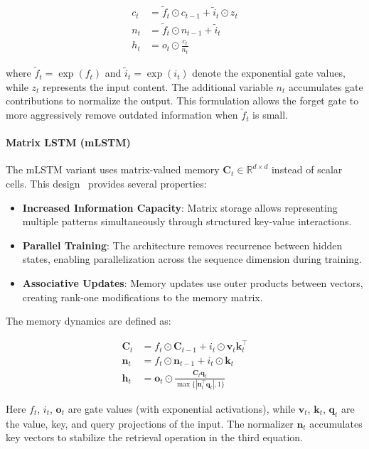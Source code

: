 \begin{align}
c_t &= \tilde{f}_t \odot c_{t-1} + \tilde{i}_t \odot z_t \\
n_t &= \tilde{f}_t \odot n_{t-1} + \tilde{i}_t \\
h_t &= o_t \odot \frac{c_t}{n_t}
\end{align}

where $\tilde{f}_t = \exp(f_t)$ and $\tilde{i}_t = \exp(i_t)$ denote the exponential gate values, while $z_t$ represents the input content. The additional variable $n_t$ accumulates gate contributions to normalize the output. This formulation allows the forget gate to more aggressively remove outdated information when $\tilde{f}_t$ is small.

\paragraph{Matrix LSTM (mLSTM)}
The \ac{mLSTM} variant uses matrix-valued memory $\mathbf{C}_t \in \mathbb{R}^{d \times d}$ instead of scalar cells. This design~\cite{beck2024xlstm} provides several properties:

\begin{itemize}
    \item \textbf{Increased Information Capacity}: Matrix storage allows representing multiple patterns simultaneously through structured key-value interactions.
    
    \item \textbf{Parallel Training}: The architecture removes recurrence between hidden states, enabling parallelization across the sequence dimension during training.
    
    \item \textbf{Associative Updates}: Memory updates use outer products between vectors, creating rank-one modifications to the memory matrix.
\end{itemize}

The memory dynamics are defined as:

\begin{align}
\mathbf{C}_t &= f_t \odot \mathbf{C}_{t-1} + i_t \odot \mathbf{v}_t \mathbf{k}_t^{\top} \\
\mathbf{n}_t &= f_t \odot \mathbf{n}_{t-1} + i_t \odot \mathbf{k}_t \\
\mathbf{h}_t &= \mathbf{o}_t \odot \frac{\mathbf{C}_t \mathbf{q}_t}{\max\{|\mathbf{n}_t^{\top} \mathbf{q}_t|, 1\}}
\end{align}

Here $f_t$, $i_t$, $\mathbf{o}_t$ are gate values (with exponential activations), while $\mathbf{v}_t$, $\mathbf{k}_t$, $\mathbf{q}_t$ are the value, key, and query projections of the input. The normalizer $\mathbf{n}_t$ accumulates key vectors to stabilize the retrieval operation in the third equation.

